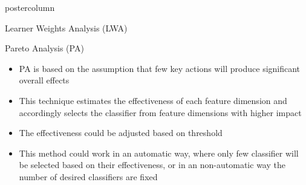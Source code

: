 \documentclass[final]{beamer}
\begin{document}
\begin{frame}
\begin{columns}
\begin{column}{.49\textwidth}
\begin{beamercolorbox}[center,wd=\textwidth]{postercolumn}
\begin{minipage}[T]{.95\textwidth}
{\begin{block}{Learner Weights Analysis (LWA)}
\begin{itemize}
\begin{itemize}
				\end{itemize}
            \end{itemize}  
          \end{block}
          \begin{block}{Pareto Analysis (PA)}
          	\begin{itemize}
          		\item PA is based on the assumption that few key actions will produce significant overall effects 
          		\item This technique estimates the effectiveness of each feature dimension and accordingly selects the classifier from feature dimensions with higher impact
          		\item The effectiveness could be adjusted based on threshold
          		\item This method could work in an automatic way, where only few classifier will be selected based on their effectiveness, or in an non-automatic way the number of desired classifiers are fixed
         	\end{itemize}            
               
          \end{block}
            \vfill
           
          }
        \end{minipage}
      \end{beamercolorbox}
    \end{column}


\end{columns}
\end{frame}
\end{document}
